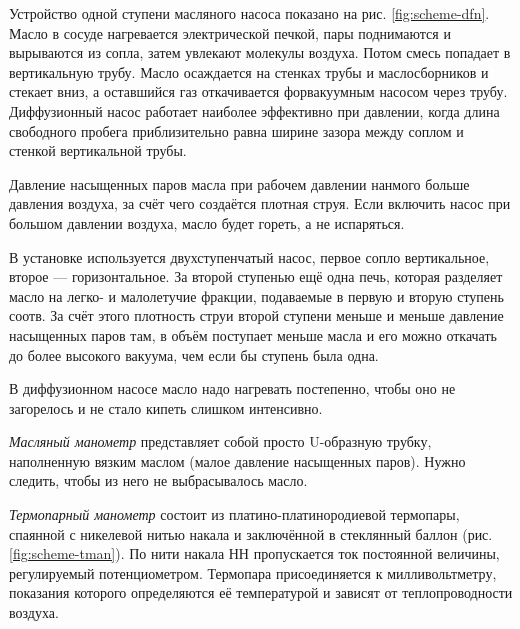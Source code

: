 \documentclass[12pt]{article}
\newcommand{\fref}[1]{рис. \ref{#1}}
\begin{document}
	Устройство одной ступени масляного насоса показано на \fref{fig:scheme-dfn}. Масло в сосуде нагревается электрической печкой, пары поднимаются и вырываются из сопла, затем увлекают молекулы воздуха. Потом смесь попадает в вертикальную трубу. Масло осаждается на стенках трубы и маслосборников и стекает вниз, а оставшийся газ откачивается форвакуумным насосом через трубу. Диффузионный насос работает наиболее эффективно при давлении, когда длина свободного пробега приблизительно равна ширине зазора между соплом и стенкой вертикальной трубы.
	
	Давление насыщенных паров масла при рабочем давлении нанмого больше давления воздуха, за счёт чего создаётся плотная струя. Если включить насос при большом давлении воздуха, масло будет гореть, а не испаряться.
	
	В установке используется двухступенчатый насос, первое сопло вертикальное, второе --- горизонтальное. За второй ступенью ещё одна печь, которая разделяет масло на легко- и малолетучие фракции, подаваемые в первую и вторую ступень соотв. За счёт этого плотность струи второй ступени меньше и меньше давление насыщенных паров там, в объём поступает меньше масла и его можно откачать до более высокого вакуума, чем если бы ступень была одна.
	
	В диффузионном насосе масло надо нагревать постепенно, чтобы оно не загорелось и не стало кипеть слишком интенсивно.
	
	\textit{Масляный манометр} представляет собой просто U-образную трубку, наполненную вязким маслом (малое давление насыщенных паров). Нужно следить, чтобы из него не выбрасывалось масло.
	
	\textit{Термопарный манометр} состоит из платино-платинородиевой термопары, спаянной с никелевой нитью накала и заключённой в стеклянный баллон (\fref{fig:scheme-tman}). По нити накала НН пропускается ток постоянной величины, регулируемый потенциометром. Термопара присоединяется к милливольтметру, показания которого определяются её температурой и зависят от теплопроводности воздуха.
	
\end{document}
